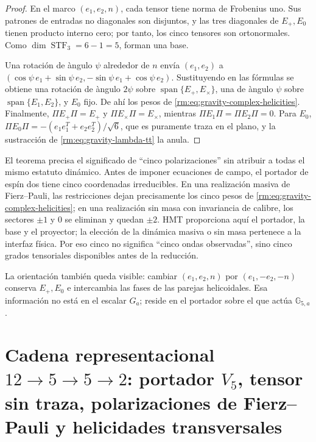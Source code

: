 \begin{proof}
En el marco \((e_1,e_2,n)\), cada tensor tiene norma de Frobenius uno.
Sus patrones de entradas no diagonales son disjuntos, y las tres diagonales
de \(E_+,E_0\) tienen producto interno cero; por tanto, los cinco tensores
son ortonormales. Como \(\dim\operatorname{STF}_3=6-1=5\), forman una base.

Una rotaci\'on de \`angulo \(\psi\) alrededor de \(n\) env\'ia
\((e_1,e_2)\) a
\((\cos\psi\,e_1+\sin\psi\,e_2,
-\sin\psi\,e_1+\cos\psi\,e_2)\). Sustituyendo en las f\'ormulas se obtiene
una rotaci\'on de \`angulo \(2\psi\) sobre
\(\operatorname{span}\{E_+,E_\times\}\), una de \`angulo \(\psi\) sobre
\(\operatorname{span}\{E_1,E_2\}\), y \(E_0\) fijo. De ah\'i los pesos de
\cref{rm:eq:gravity-complex-helicities}. Finalmente,
\(\Pi E_{+}\Pi=E_+\) y \(\Pi E_\times\Pi=E_\times\), mientras
\(\Pi E_1\Pi=\Pi E_2\Pi=0\). Para \(E_0\),
\(\Pi E_0\Pi=-(e_1e_1^T+e_2e_2^T)/\sqrt6\), que es puramente traza en
el plano, y la sustracci\'on de \cref{rm:eq:gravity-lambda-tt} la anula.
\end{proof}

El teorema precisa el significado de ``cinco polarizaciones'' sin atribuir
a todas el mismo estatuto din\'amico. Antes de imponer ecuaciones de campo,
el portador de esp\'in dos tiene cinco coordenadas irreducibles. En una
realizaci\'on masiva de Fierz--Pauli, las restricciones dejan precisamente
los cinco pesos de \cref{rm:eq:gravity-complex-helicities}; en una realizaci\'on
sin masa con invariancia de calibre, los sectores \(\pm1\) y \(0\) se eliminan y
quedan \(\pm2\). HMT proporciona aqu\'i el portador, la base y el proyector;
la elecci\'on de la din\'amica masiva o sin masa pertenece a la interfaz
f\'isica. Por eso cinco no significa ``cinco ondas observadas'', sino cinco
grados tensoriales disponibles antes de la reducci\'on.

La orientaci\'on tambi\'en queda visible: cambiar
\((e_1,e_2,n)\) por \((e_1,-e_2,-n)\) conserva \(E_+,E_0\) e intercambia
las fases de las parejas helicoidales. Esa informaci\'on no est\'a en el
escalar \(G_a\); reside en el portador sobre el que act\'ua
\(\mathbb G_{5,a}\).

\section{Cadena representacional \(12\to5\to5\to2\): portador \(V_5\), tensor sin traza, polarizaciones de Fierz–Pauli y helicidades transversales}

